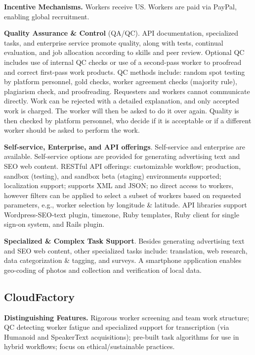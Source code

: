 \documentclass{sigchi}
\begin{document}
{\bf Incentive Mechanisms.} 
Workers  
receive  US. Workers are paid via PayPal, enabling global recruitment.

{\bf Quality Assurance \& Control} (QA/QC). API documentation, specialized tasks, and enterprise service promote quality, along with tests, continual evaluation, and job allocation according to skills and peer review. Optional QC includes  use of internal QC checks or use of a second-pass worker to proofread and correct first-pass work products. QC methods include: random spot testing by platform personnel, gold checks, worker agreement checks (majority rule), plagiarism check, 
and proofreading. Requesters and workers cannot communicate directly. Work can be rejected with a detailed explanation, and only accepted work is charged. The worker will then be asked to do it over again. Quality is then checked by platform personnel, who decide if it is acceptable or if a different worker should be asked to perform the work. 




{\bf Self-service, Enterprise, and API offerings}. Self-service and enterprise are available. Self-service options are provided for generating advertising text and SEO web content. RESTful API offerings: customizable workflow; production, sandbox (testing), and sandbox beta (staging) environments supported; localization support; supports XML and JSON; no direct access to workers, however filters can be applied to select a subset of workers based on requested parameters, e.g., worker selection by longitude \& latitude. API libraries support Wordpress-SEO-text plugin, timezone, Ruby templates, Ruby client for single sign-on system, and Rails plugin. 

{\bf Specialized \& Complex Task Support}. Besides generating advertising text and SEO web content, other specialized tasks include: translation, web research, data categorization \& tagging, and surveys. 
A smartphone application enables geo-coding of photos and collection and verification of local data. 




\subsection{CloudFactory}

{\bf Distinguishing Features.} Rigorous worker screening and team work structure; QC detecting worker fatigue and specialized support for transcription (via Humanoid and SpeakerText acquisitions); pre-built task algorithms for use in hybrid workflows; focus on ethical/sustainable practices.
\end{document}
